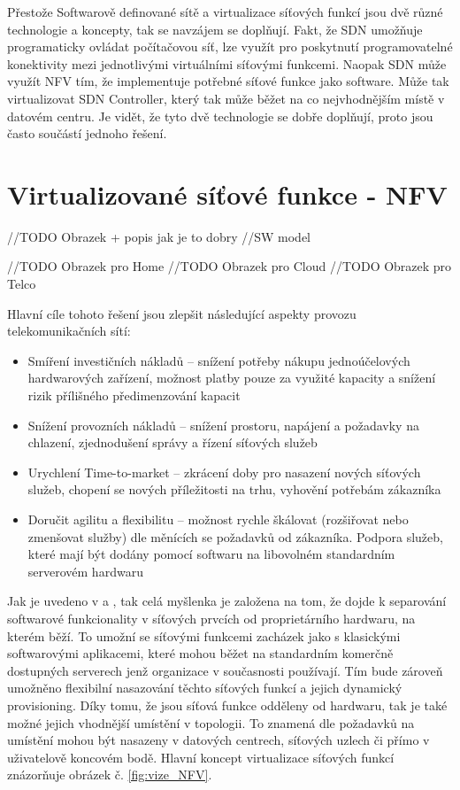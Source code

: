 Přestože Softwarově definované sítě a virtualizace síťových funkcí jsou dvě různé technologie a koncepty, tak se navzájem se doplňují. Fakt, že SDN umožňuje programaticky ovládat počítačovou síť, lze využít pro poskytnutí programovatelné konektivity mezi jednotlivými virtuálními síťovými funkcemi. Naopak SDN může využít NFV tím, že implementuje potřebné síťové funkce jako software. Může tak virtualizovat SDN Controller, který tak může běžet na co nejvhodnějším místě v datovém centru. Je vidět, že tyto dvě technologie se dobře doplňují, proto jsou často součástí jednoho řešení. \cite{SDN_book}


\section{Virtualizované síťové funkce - NFV}

//TODO Obrazek + popis jak je to dobry
//SW model

//TODO Obrazek pro Home
//TODO Obrazek pro Cloud
//TODO Obrazek pro Telco

Hlavní cíle tohoto řešení jsou zlepšit následující aspekty provozu telekomunikačních sítí:

\begin{itemize}
\item Smíření investičních nákladů – snížení potřeby nákupu jednoúčelových hardwarových zařízení, možnost platby pouze za využité kapacity a snížení rizik přílišného předimenzování kapacit
\item Snížení provozních nákladů – snížení prostoru, napájení a požadavky na chlazení, zjednodušení správy a řízení síťových služeb
\item Urychlení Time-to-market – zkrácení doby pro nasazení nových síťových služeb, chopení se nových příležitosti na trhu, vyhovění potřebám zákazníka
\item Doručit agilitu a flexibilitu – možnost rychle škálovat (rozšiřovat nebo zmenšovat služby) dle měnících se požadavků od zákazníka. Podpora služeb, které mají být dodány pomocí softwaru na libovolném standardním serverovém hardwaru
\end{itemize}

Jak je uvedeno v \cite{NFVState} a \cite{NFVChalanges}, tak celá myšlenka je založena na tom, že dojde k separování softwarové funkcionality v síťových prvcích od proprietárního hardwaru, na kterém běží. To umožní se síťovými funkcemi zacházek jako s klasickými softwarovými aplikacemi, které mohou běžet na standardním komerčně dostupných serverech jenž organizace v současnosti používají. Tím bude zároveň umožněno flexibilní nasazování těchto síťových funkcí a jejich dynamický provisioning. Díky tomu, že jsou síťová funkce odděleny od hardwaru, tak je také možné jejich vhodnější umístění v topologii. To znamená dle požadavků na umístění mohou být nasazeny v datových centrech, síťových uzlech či přímo v uživatelově koncovém bodě. Hlavní koncept virtualizace síťových funkcí znázorňuje obrázek č. \ref{fig:vize_NFV}. 

